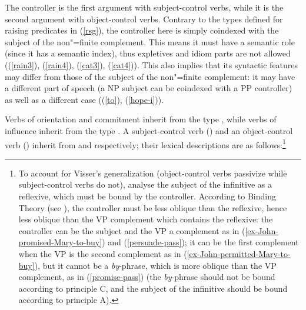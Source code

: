 The controller is the first argument with subject-control verbs, while it is the second argument
with object-control verbs. Contrary to the types defined for raising predicates in (\ref{rsg}), the
controller here is simply coindexed with the subject of the non"=finite complement. 
This means it
must have a semantic role (since it has a semantic index), thus expletives and idiom parts are not
allowed ((\ref{rain3}), (\ref{rain4}), (\ref{cat3}), (\ref{cat4})). This also implies that its
syntactic features may differ from those of the subject of the non"=finite complement: it may have a
different part of speech (a NP subject can be coindexed with a PP controller) as well as a different
case ((\ref{to}), (\ref{hope-i})).

Verbs of orientation and commitment inherit from the type , while verbs of
influence inherit from the type .  A subject-control verb () and an
object-control verb () inherit from  and 
respectively; their lexical descriptions are as follows:\footnote{To account for Visser's
  generalization (object-control verbs passivize while subject-control verbs do not),
  \citet{SagandPollard1991} analyse the subject of the infinitive as a reflexive, which must be
  bound by the controller. According to Binding Theory (see ), the
  controller must be less oblique than the reflexive, hence less oblique than the VP complement
  which contains the reflexive: the controller can be the subject and the VP a complement as in
  (\ref{ex-John-promised-Mary-to-buy}) and (\ref{persuade-pass}); it can be the first complement
  when the VP is the second complement as in (\ref{ex-John-permitted-Mary-to-buy}), but it cannot be
  a \emph{by}-phrase, which is more oblique than the VP complement, as in (\ref{promise-pass}) (the
  \emph{by}-phrase should not be bound according to principle C, and the subject of the infinitive
  should be bound according to principle A).}

